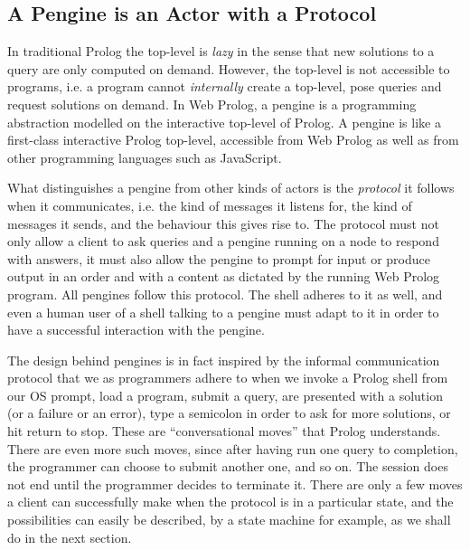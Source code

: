 \documentclass{tlp}
\begin{document}
\subsection{A Pengine is an Actor with a Protocol}

\noindent In traditional Prolog the top-level is \textit{lazy} in the sense that new solutions to a query are only computed on demand. However, the top-level is not accessible to programs, i.e. a program cannot \emph{internally} create a top-level, pose queries and request solutions on demand. In Web Prolog, a pengine is a programming abstraction modelled on the interactive top-level of Prolog. A pengine is like a first-class interactive Prolog top-level, accessible from Web Prolog as well as from other programming languages such as JavaScript. 


What distinguishes a pengine from other kinds of actors is the \textit{protocol} it follows when it communicates, i.e. the kind of messages it listens for, the kind of messages it sends, and the behaviour this gives rise to. The protocol must not only allow a client to ask queries and a pengine running on a node to respond with answers, it must also allow the pengine to prompt for input or produce output in an order and with a content as dictated by the running Web Prolog program. All pengines follow this protocol. The shell adheres to it as well, and even a human user of a shell talking to a pengine must adapt to it in order to have a successful interaction with the pengine.

The design behind pengines is in fact inspired by the informal communication protocol that we as programmers adhere to when we invoke a Prolog shell from our OS prompt, load a program, submit a query, are presented with a solution (or a failure or an error), type a semicolon in order to ask for more solutions, or hit return to stop. These are ``conversational moves'' that Prolog understands. There are even more such moves, since after having run one query to completion, the programmer can choose to submit another one, and so on. The session does not end until the programmer decides to terminate it. There are only a few moves a client can successfully make when the protocol is in a particular state, and the possibilities can easily be described, by a state machine for example, as we shall do in the next section.
\end{document}
